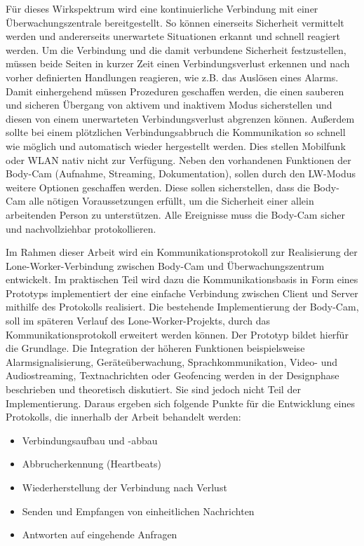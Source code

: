 \documentclass[thesis.tex]{subfiles}
\begin{document}
Für dieses Wirkspektrum wird eine kontinuierliche Verbindung mit einer Überwachungszentrale bereitgestellt.
So können einerseits Sicherheit vermittelt werden und andererseits unerwartete Situationen erkannt und schnell reagiert werden.
Um die Verbindung und die damit verbundene Sicherheit festzustellen, müssen beide Seiten in kurzer Zeit einen Verbindungsverlust erkennen und nach vorher definierten Handlungen reagieren, wie z.B. das Auslösen eines Alarms.
Damit einhergehend müssen Prozeduren geschaffen werden, die einen sauberen und sicheren Übergang von aktivem und inaktivem Modus sicherstellen und diesen von einem unerwarteten Verbindungsverlust abgrenzen können.
Außerdem sollte bei einem plötzlichen Verbindungsabbruch die Kommunikation so schnell wie möglich und automatisch wieder hergestellt werden.
Dies stellen Mobilfunk oder WLAN nativ nicht zur Verfügung.
Neben den vorhandenen Funktionen der Body-Cam (Aufnahme, Streaming, Dokumentation), sollen durch den LW-Modus weitere Optionen geschaffen werden.
Diese sollen sicherstellen, dass die Body-Cam alle nötigen Voraussetzungen erfüllt, um die Sicherheit einer allein arbeitenden Person zu unterstützen.
Alle Ereignisse muss die Body-Cam sicher und nachvollziehbar protokollieren.

Im Rahmen dieser Arbeit wird ein Kommunikationsprotokoll zur Realisierung der Lone-Worker-Verbindung zwischen Body-Cam und Überwachungszentrum entwickelt.
Im praktischen Teil wird dazu die Kommunikationsbasis in Form eines Prototyps implementiert der eine einfache Verbindung zwischen Client und Server mithilfe des Protokolls realisiert.
Die bestehende Implementierung der Body-Cam, soll im späteren Verlauf des Lone-Worker-Projekts, durch das Kommunikationsprotokoll erweitert werden können.
Der Prototyp bildet hierfür die Grundlage.
Die Integration der höheren Funktionen beispielsweise Alarmsignalisierung, Geräteüberwachung, Sprachkommunikation, Video- und Audiostreaming, Textnachrichten oder Geofencing werden in der Designphase beschrieben und theoretisch diskutiert.
Sie sind jedoch nicht Teil der Implementierung.
Daraus ergeben sich folgende Punkte für die Entwicklung eines Protokolls, die innerhalb der Arbeit behandelt werden:
\begin{itemize}
    \item Verbindungsaufbau und -abbau
    \item Abbrucherkennung (Heartbeats)
    \item Wiederherstellung der Verbindung nach Verlust
    \item Senden und Empfangen von einheitlichen Nachrichten
    \item Antworten auf eingehende Anfragen
\end{itemize}
\end{document}
